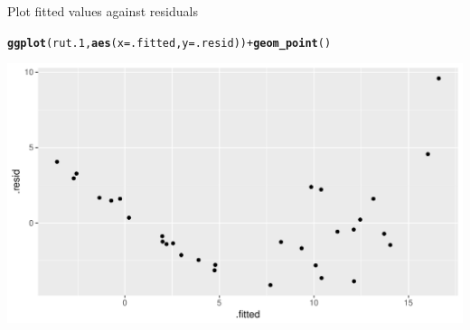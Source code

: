 \documentclass[unknownkeysallowed]{beamer}\usepackage[]{graphicx}\usepackage[]{color}
\makeatletter
\def\maxwidth{ %
  \ifdim\Gin@nat@width>\linewidth
    \linewidth
  \else
    \Gin@nat@width
  \fi
}
\newcommand{\hlopt}[1]{\textcolor[rgb]{0,0,0}{#1}}%
\newcommand{\hlstd}[1]{\textcolor[rgb]{0.345,0.345,0.345}{#1}}%
\newcommand{\hlkwc}[1]{\textcolor[rgb]{0.333,0.667,0.333}{#1}}%
\newcommand{\hlkwd}[1]{\textcolor[rgb]{0.737,0.353,0.396}{\textbf{#1}}}%
\newenvironment{kframe}{%
 \def\at@end@of@kframe{}%
 \ifinner\ifhmode%
  \def\at@end@of@kframe{\end{minipage}}%
  \begin{minipage}{\columnwidth}%
 \fi\fi%
 \def\FrameCommand##1{\hskip\@totalleftmargin \hskip-\fboxsep
 \colorbox{shadecolor}{##1}\hskip-\fboxsep
     \hskip-\linewidth \hskip-\@totalleftmargin \hskip\columnwidth}%
 \MakeFramed {\advance\hsize-\width
   \@totalleftmargin\z@ \linewidth\hsize
   \@setminipage}}%
 {\par\unskip\endMakeFramed%
 \at@end@of@kframe}
\newenvironment{knitrout}{}{} %
\makeatother
\begin{document}
\begin{frame}[fragile]{Plot fitted values against residuals}
  
\begin{knitrout}
\color{fgcolor}\begin{kframe}
\begin{alltt}
\hlkwd{ggplot}\hlstd{(rut.1,}\hlkwd{aes}\hlstd{(}\hlkwc{x}\hlstd{=.fitted,}\hlkwc{y}\hlstd{=.resid))}\hlopt{+}\hlkwd{geom_point}\hlstd{()}
\end{alltt}
\end{kframe}
\includegraphics[width=\maxwidth]{figure/unnamed-chunk-287-1} 

\end{knitrout}
  
\end{frame}
\end{document}
